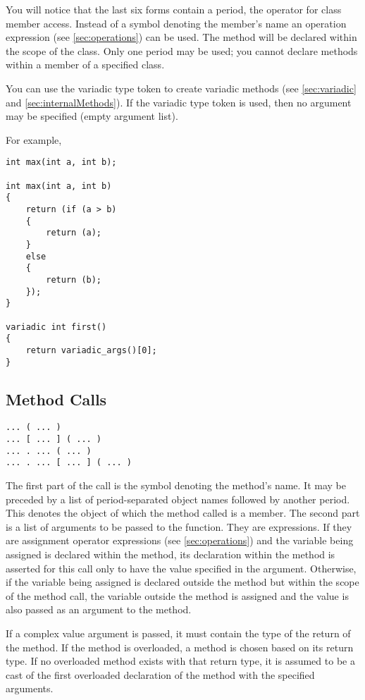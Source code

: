 \documentclass[10pt,a4paper]{article}
\begin{document}
You will notice that the last six forms contain a period, the operator for class member access. Instead of a symbol denoting the member's name an operation expression (see \ref{sec:operations}) can be used. The method will be declared within the scope of the class. Only one period may be used; you cannot declare methods within a member of a specified class.

You can use the variadic type token to create variadic methods (see \ref{sec:variadic} and \ref{sec:internalMethods}). If the variadic type token is used, then no argument may be specified (empty argument list).

For example,
\begin{verbatim}
int max(int a, int b);

int max(int a, int b)
{
    return (if (a > b)
    {
        return (a);
    }
    else
    {
        return (b);
    });
}

variadic int first()
{
    return variadic_args()[0];
}
\end{verbatim}

\subsection{Method Calls}
\label{sec:methodCalls}
\begin{verbatim}
... ( ... )
... [ ... ] ( ... )
... . ... ( ... )
... . ... [ ... ] ( ... )
\end{verbatim}

The first part of the call is the symbol denoting the method's name. It may be preceded by a list of period-separated object names followed by another period. This denotes the object of which the method called is a member. The second part is a list of arguments to be passed to the function. They are expressions. If they are assignment operator expressions (see \ref{sec:operations}) and the variable being assigned is declared within the method, its declaration within the method is asserted for this call only to have the value specified in the argument. Otherwise, if the variable being assigned is declared outside the method but within the scope of the method call, the variable outside the method is assigned and the value is also passed as an argument to the method.

If a complex value argument is passed, it must contain the type of the return of the method. If the method is overloaded, a method is chosen based on its return type. If no overloaded method exists with that return type, it is assumed to be a cast of the first overloaded declaration of the method with the specified arguments.
\end{document}
